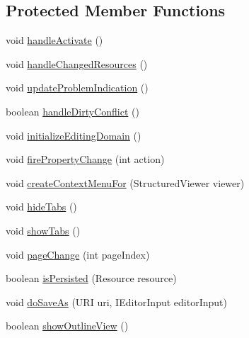 \subsection*{Protected Member Functions}
\begin{DoxyCompactItemize}
\item 
void \hyperlink{classshootingmachineemfmodel_1_1presentation_1_1_shootingmachineemfmodel_editor_aaf6cd44bf366dfca6607f13fa8d590ae}{handle\-Activate} ()
\item 
void \hyperlink{classshootingmachineemfmodel_1_1presentation_1_1_shootingmachineemfmodel_editor_afd0734815fcdea2d1c2868a4ed40485c}{handle\-Changed\-Resources} ()
\item 
void \hyperlink{classshootingmachineemfmodel_1_1presentation_1_1_shootingmachineemfmodel_editor_aa510b09153079a41265e0b4f8a5674a9}{update\-Problem\-Indication} ()
\item 
boolean \hyperlink{classshootingmachineemfmodel_1_1presentation_1_1_shootingmachineemfmodel_editor_a82f0152ac38a1bbe535a0470dc079d67}{handle\-Dirty\-Conflict} ()
\item 
void \hyperlink{classshootingmachineemfmodel_1_1presentation_1_1_shootingmachineemfmodel_editor_ab4c486217d8b4c4dacf19fba250010fe}{initialize\-Editing\-Domain} ()
\item 
void \hyperlink{classshootingmachineemfmodel_1_1presentation_1_1_shootingmachineemfmodel_editor_afd66d9ae0fcb3735e3b99e6719db497d}{fire\-Property\-Change} (int action)
\item 
void \hyperlink{classshootingmachineemfmodel_1_1presentation_1_1_shootingmachineemfmodel_editor_ae92f06e8f18ed179045998e37130376a}{create\-Context\-Menu\-For} (Structured\-Viewer viewer)
\item 
void \hyperlink{classshootingmachineemfmodel_1_1presentation_1_1_shootingmachineemfmodel_editor_a7b5273ecc9192039abeaa9c52d52402f}{hide\-Tabs} ()
\item 
void \hyperlink{classshootingmachineemfmodel_1_1presentation_1_1_shootingmachineemfmodel_editor_a4183f0592c101100b52b5cbc23817db4}{show\-Tabs} ()
\item 
void \hyperlink{classshootingmachineemfmodel_1_1presentation_1_1_shootingmachineemfmodel_editor_a461ade82b42bd31ff896f55b336e05b7}{page\-Change} (int page\-Index)
\item 
boolean \hyperlink{classshootingmachineemfmodel_1_1presentation_1_1_shootingmachineemfmodel_editor_a36db5b7414634a9185b5526149d8c7ad}{is\-Persisted} (Resource resource)
\item 
void \hyperlink{classshootingmachineemfmodel_1_1presentation_1_1_shootingmachineemfmodel_editor_aa3c6b6709dd8cae9cd4b5cd5a48d5fea}{do\-Save\-As} (U\-R\-I uri, I\-Editor\-Input editor\-Input)
\item 
boolean \hyperlink{classshootingmachineemfmodel_1_1presentation_1_1_shootingmachineemfmodel_editor_a9797f6efabfa6013ca83e6929994e2aa}{show\-Outline\-View} ()
\end{DoxyCompactItemize}
